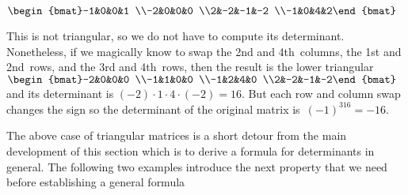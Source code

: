 \begin{example}
\begin{Parts}
\begin{OmitV1}
\item \(\begin{bmat}-1&0&0&1
\\-2&0&0&0
\\2&-2&-1&-2
\\-1&0&4&2\end{bmat}\)
\begin{solution} 
This is not triangular, so we do not have to compute its determinant. 
Nonetheless, if we magically know to swap the 2nd and 4th~columns, the 1st and 2nd~rows, and the 3rd and 4th~rows, then the result is the lower triangular \(\begin{bmat}-2&0&0&0
\\-1&1&0&0
\\-1&2&4&0
\\2&-2&-1&-2\end{bmat}\) and its determinant is \((-2)\cdot1\cdot4\cdot(-2)=16\). 
But each row and column swap changes the sign so the determinant of the original matrix is~\((-1)^316=-16\). 
\end{solution}
\end{OmitV1}
\end{Parts}
\end{example}



The above case of triangular matrices is a short detour from the main development of this section which is to derive a formula for determinants in general.
The following two examples introduce the next property that we need before establishing a general formula 


